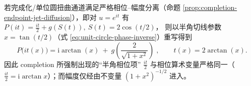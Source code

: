 \begin{remark}\label{rem:unit-circle-phase-completion-half-angle}
若完成化/单位圆扭曲通道满足严格相位--幅度分离（命题 \ref{prop:completion-endpoint-jet-diffusion}），即对 \(u=e^{it}\) 有
\(
P(it)=\frac{it}{2}+g(S(t)),\ S(t)=2\cos(t/2)
\)，
则以半角切线参数 \(x=\tan(t/2)\)（式 \eqref{eq:unit-circle-phase-inverse}）重写得到
\[
\boxed{\;
P\!\bigl(it(x)\bigr)
=\mathrm{i}\arctan(x)\ +\ g\!\left(\frac{2}{\sqrt{1+x^2}}\right)\;},
\qquad t(x)=2\arctan(x).
\]
因此 completion 所强制出现的“半角相位项” \(\frac{it}{2}\) 与相位算术变量严格同一（\(\frac{it}{2}=\mathrm{i}\arctan x\)）；而幅度仅经由不变量 \((1+x^2)^{-1/2}\) 进入。
\end{remark}
